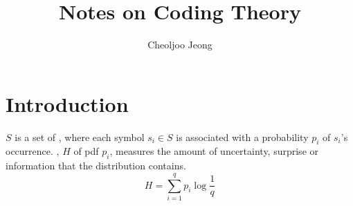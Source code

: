 \documentclass{myproc}
\begin{document}
\title{\large\bf{}Notes on Coding Theory}
\author{\normalsize Cheoljoo Jeong}
\date{}
\maketitle


\section{Introduction}
\bit
\w $S$ is a set of , where each symbol $s_i \in S$ is associated
with a probability $p_i$ of $s_i$'s occurrence.
\w {}, $H$ of pdf $p_i$, 
   measures the amount of uncertainty, surprise or information that the
   distribution contains.
  \[ H = \sum_{i=1}^q p_i \log{\frac{1}{q}}\]
\w {}
\eit
\end{document}
